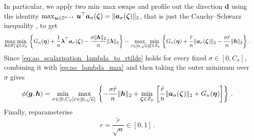 \documentclass{article}
\makeatletter
\theoremstyle{definition}
\newcommand{\vnorm}[1]{%
	\ensuremath{%
		\if@display
		\left\| #1 \right\|
		\else
		\| #1 \|
		\fi
	}%
}
\newcommand*{\bb}{\boldsymbol}
\def\bu{\bb{u}}
\def\bh{\bb{h}}
\def\bg{\bb{g}}
\def\blambda{\bb{\lambda}}
\makeatother
\begin{document}
\begin{bibunit}
In particular, we apply two min--max swaps and profile out the direction $\bb d$ using the identity $\max_{\bu\in\mathbb S^{n-1}} \,
	\bu^\top
	\bb a_\sigma(\bb{\zeta})
	=
	\vnorm{
		\bb a_\sigma(\bb{\zeta})
	}_2$, that is just the Cauchy--Schwarz inequality \citep[Theorem~1.37(d)]{rudin+etal:1976}, to get 
\begin{equation}
	\label{eq:ao_scalarisation_lambda_to_rtilde}
	\begin{aligned}
		\underset{\blambda\in\mathcal B^n_1}{\max}
		\underset{\bb{\zeta}\in Z_p}{\min} \,
		\left\{
			G_n(\bb\eta)
			+
			\frac{1}{n}
			\blambda^\top
			\bb a_\sigma(\bb{\zeta})
			-
			\frac{\sigma\vnorm{\bh}_2}{n}
			\vnorm{\blambda}_2
		\right\} 
		=
		\underset{\tilde r\in[0,\sqrt n]}{\max}
		\underset{\bb{\zeta}\in Z_p}{\min} \,
		\left\{
			G_n(\bb\eta)
			+
			\frac{\tilde r}{n}
			\vnorm{
				\bb a_\sigma(\bb{\zeta})
			}_2
			-
			\frac{\sigma\tilde r}{n}
			\vnorm{\bh}_2
		\right\} \,.
	\end{aligned}
\end{equation}
Since \eqref{eq:ao_scalarisation_lambda_to_rtilde} holds for every fixed
$\sigma\in[0,C_\sigma]$, combining it with \eqref{eq:ao_lambda_max}
and then taking the outer minimum over $\sigma$ gives
\begin{equation}
	\label{eq:ao_scalarisation_rtilde}
	\begin{aligned}
		\phi(\bg,\bh)
		=
		\underset{\sigma\in[0,C_\sigma]}{\min}
		\underset{\tilde r\in[0,\sqrt n]}{\max} \,
		\left\{
			-
			\frac{\sigma\tilde r}{n}
			\vnorm{\bh}_2
			+
			\underset{\bb{\zeta}\in Z_p}{\min} \,
			\left[
				\frac{\tilde r}{n}
				\vnorm{
					\bb a_\sigma(\bb{\zeta})
				}_2
				+
				G_n(\bb\eta)
			\right]
		\right\} \,.
	\end{aligned}
\end{equation}
Finally, reparameterise
\begin{equation}
	\label{eq:ao_scalarisation_r_reparam}
	r
	=
	\frac{\tilde r}{\sqrt n}
	\in[0,1] \,.
\end{equation}

\end{bibunit}
\end{document}
